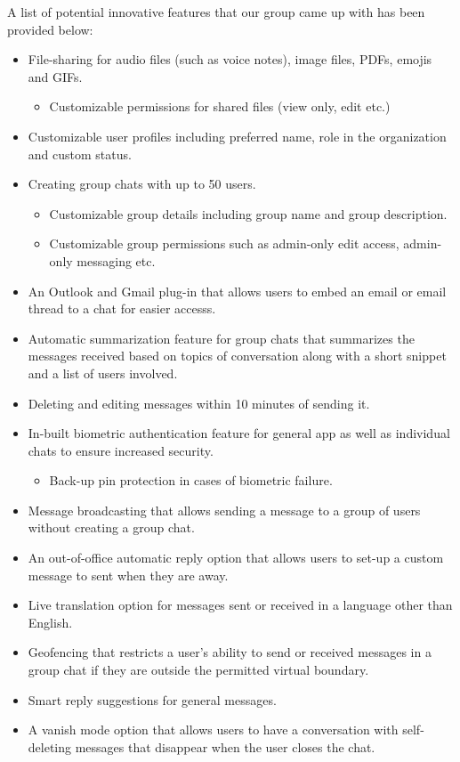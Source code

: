 \documentclass[]{article}
\begin{document}
A list of potential innovative features that our group came up with has been provided below:
\begin{itemize}
	\item File-sharing for audio files (such as voice notes), image files, PDFs, emojis and GIFs.
	      \begin{itemize}
		      \item Customizable permissions for shared files (view only, edit etc.)
	      \end{itemize}
	\item Customizable user profiles including preferred name, role in the organization and custom status.
	\item Creating group chats with up to 50 users.
	      \begin{itemize}
		      \item Customizable group details including group name and group description.
		      \item Customizable group permissions such as admin-only edit access, admin-only messaging etc.
	      \end{itemize}
	\item An Outlook and Gmail plug-in that allows users to embed an email or email thread to a chat for easier accesss.
	\item Automatic summarization feature for group chats that summarizes the messages received based on topics of conversation along with a short snippet and a list of users involved.
	\item Deleting and editing messages within 10 minutes of sending it.
	\item In-built biometric authentication feature for general app as well as individual chats to ensure increased security.
	      \begin{itemize}
		      \item Back-up pin protection in cases of biometric failure.
	      \end{itemize}
	\item Message broadcasting that allows sending a message to a group of users without creating a group chat.
	\item An out-of-office automatic reply option that allows users to set-up a custom message to sent when they are away.
	\item Live translation option for messages sent or received in a language other than English.
	\item Geofencing that restricts a user's ability to send or received messages in a group chat if they are outside the permitted virtual boundary.
	\item Smart reply suggestions for general messages.
	\item A vanish mode option that allows users to have a conversation with self-deleting messages that disappear when the user closes the chat.
\end{itemize}
\end{document}
